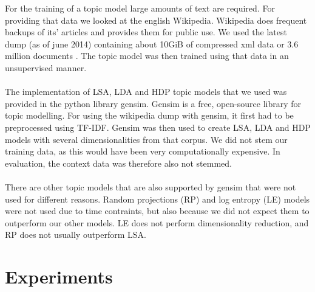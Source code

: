 For the training of a topic model large amounts of text are required. For providing that data we looked at the english Wikipedia. Wikipedia does frequent backups of its' articles and provides them for public use. We used the latest dump (as of june 2014) containing about 10GiB of compressed xml data or 3.6 million documents \cite{wikidumps}. The topic model was then trained using that data in an unsupervised manner.\\\\
The implementation of LSA, LDA and HDP topic models that we used was provided in the python library gensim. Gensim is a free, open-source library for topic modelling. For using the wikipedia dump with gensim, it first had to be preprocessed using TF-IDF. Gensim was then used to create LSA, LDA and HDP models with several dimensionalities from that corpus. We did not stem our training data, as this would have been very computationally expensive. In evaluation, the context data was therefore also not stemmed.\\\\
There are other topic models that are also supported by gensim that were not used for different reasons. Random projections (RP) \cite{RandomProjections, gensimRP} and log entropy (LE) \cite{LogEntropy, gensimLE} models were not used due to time contraints, but also because we did not expect them to outperform our other models. LE does not perform dimensionality reduction, and RP does not usually outperform LSA. 


\thispagestyle{plain}



\section{Experiments}
